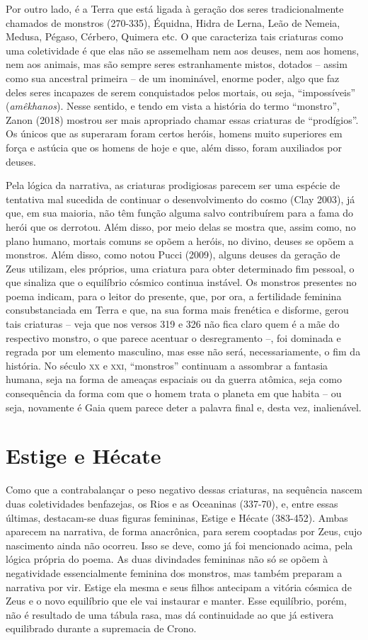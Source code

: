 Por outro lado, é a Terra que está ligada à geração dos seres
tradicionalmente chamados de monstros (270-335), Équidna, Hidra de
Lerna, Leão de Nemeia, Medusa, Pégaso, Cérbero, Quimera etc. O que
caracteriza tais criaturas como uma coletividade é que elas não se
assemelham nem aos deuses, nem aos homens, nem aos animais, mas são sempre
seres estranhamente mistos, dotados -- assim como sua ancestral primeira
-- de um inominável, enorme poder, algo que faz deles seres incapazes de
serem conquistados pelos mortais, ou seja, ``impossíveis''
(\emph{amêkhanos}). Nesse sentido, e tendo em vista a história do termo
``monstro'', Zanon (2018) mostrou ser mais apropriado chamar essas
criaturas de ``prodígios''. Os únicos que as superaram foram certos
heróis, homens muito superiores em força e astúcia que os homens de hoje
e que, além disso, foram auxiliados por deuses.

Pela lógica da narrativa, as criaturas prodigiosas parecem ser uma
espécie de tentativa mal sucedida de continuar o desenvolvimento do
cosmo (Clay 2003), já que, em sua maioria, não têm função alguma salvo
contribuírem para a fama do herói que os derrotou. Além disso, por meio
delas se mostra que, assim como, no plano humano, mortais comuns se
opõem a heróis, no divino, deuses se opõem a monstros. Além disso, como
notou Pucci (2009), alguns deuses da geração de Zeus utilizam, eles
próprios, uma criatura para obter determinado fim pessoal, o que
sinaliza que o equilíbrio cósmico continua instável. Os monstros
presentes no poema indicam, para o leitor do presente, que, por ora, a
fertilidade feminina consubstanciada em Terra e que, na sua forma mais
frenética e disforme, gerou tais criaturas -- veja que nos versos 319 e
326 não fica claro quem é a mãe do respectivo monstro, o que parece
acentuar o desregramento --, foi dominada e regrada por um elemento
masculino, mas esse não será, necessariamente, o fim da história. No
século \textsc{xx} e \textsc{xxi}, ``monstros'' continuam a assombrar a fantasia humana,
seja na forma de ameaças espaciais ou da guerra atômica, seja como
consequência da forma com que o homem trata o planeta em que habita --
ou seja, novamente é Gaia quem parece deter a palavra final e, desta
vez, inalienável.

\section{Estige e Hécate}

Como que a contrabalançar o peso negativo dessas criaturas, na sequência
nascem duas coletividades benfazejas, os Rios e as Oceaninas (337-70),
e, entre essas últimas, destacam-se duas figuras femininas, Estige e
Hécate (383-452). Ambas aparecem na narrativa, de forma anacrônica, para
serem cooptadas por Zeus, cujo nascimento ainda não ocorreu. Isso se
deve, como já foi mencionado acima, pela lógica própria do poema. As
duas divindades femininas não só se opõem à negatividade essencialmente
feminina dos monstros, mas também preparam a narrativa por vir. Estige
ela mesma e seus filhos antecipam a vitória cósmica de Zeus e o novo
equilíbrio que ele vai instaurar e manter. Esse equilíbrio, porém, não é
resultado de uma tábula rasa, mas dá continuidade ao que já estivera
equilibrado durante a supremacia de Crono.

